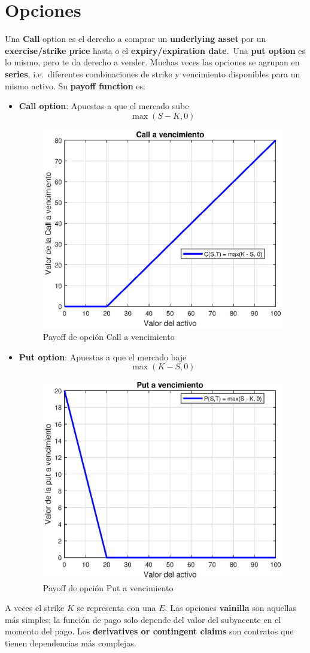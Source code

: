 

\section{Opciones}
Una \textbf{Call} option es el derecho a comprar un \textbf{underlying asset} por un \textbf{exercise/strike price} hasta o el \textbf{expiry/expiration date}.\ Una \textbf{put option} es lo mismo, pero te da derecho a vender. Muchas veces las opciones se agrupan en \textbf{series}, i.e.\ diferentes combinaciones de strike y vencimiento disponibles para un mismo activo. Su \textbf{payoff function} es:
\begin{itemize}
    \item \textbf{Call option}: Apuestas a que el mercado sube
    \[\boxed{\max(S-K, 0)}\]
    \begin{figure}[H]
        \centering
        \includegraphics[width=0.5\linewidth]{Imagenes/Parte1/2_Derivados/PayOffCall.eps}
        \caption{Payoff de opción Call a vencimiento}
    \end{figure}
    \item \textbf{Put option}: Apuestas a que el mercado baje
    \[\boxed{\max(K-S, 0)}\]
    \begin{figure}[H]
        \centering
        \includegraphics[width=0.5\linewidth]{Imagenes/Parte1/2_Derivados/PayOffPut.eps}
        \caption{Payoff de opción Put a vencimiento}
    \end{figure}
\end{itemize}
A veces el strike $K$ se representa con una $E$. Las opciones \textbf{vainilla} son aquellas más simples; la función de pago solo depende del valor del subyacente en el momento del pago. Los \textbf{derivatives or contingent claims} son contratos que tienen dependencias más complejas.


